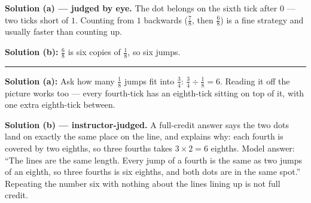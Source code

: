 \documentclass[12pt]{article}
\begin{document}
\textbf{Solution (a) --- judged by eye.} The dot belongs on the sixth tick after $0$ --- two ticks
short of $1$. Counting from $1$ backwards ($\frac{7}{8}$, then $\frac{6}{8}$) is a fine strategy and
usually faster than counting up.

\textbf{Solution (b):} $\frac{6}{8}$ is six copies of $\frac{1}{8}$, so six jumps. 

\vspace{0.15cm}\noindent\rule{\linewidth}{0.2pt}


\textbf{Solution (a):} Ask how many $\frac{1}{8}$ jumps fit into $\frac{3}{4}$:
$\frac{3}{4} \div \frac{1}{8} = 6$. Reading it off the picture works too --- every fourth-tick has an
eighth-tick sitting on top of it, with one extra eighth-tick between. 

\textbf{Solution (b) --- instructor-judged.} A full-credit answer says the two dots land on exactly the
same place on the line, and explains why: each fourth is covered by two eighths, so three fourths
takes $3 \times 2 = 6$ eighths. Model answer: ``The lines are the same length. Every jump of a fourth
is the same as two jumps of an eighth, so three fourths is six eighths, and both dots are in the same
spot.'' Repeating the number six with nothing about the lines lining up is not full credit.
\end{document}
